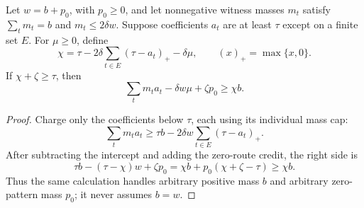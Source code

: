 

\begin{lemma}\label{lem:capped-rank-credit}
Let $w=b+p_0$, with $p_0\ge0$, and let nonnegative witness masses
$m_t$ satisfy $\sum_t m_t=b$ and $m_t\le2\delta w$.
Suppose coefficients $a_t$ are at least $\tau$ except on a finite
set $E$. For $\mu\ge0$, define
\[
 \chi=\tau-2\delta\sum_{t\in E}(\tau-a_t)_+-\delta\mu,
 \qquad (x)_+=\max\{x,0\}.
\]
If $\chi+\zeta\ge\tau$, then
\begin{equation}\label{eq:capped-rank-conversion}
 \sum_t m_t a_t-\delta w\mu+\zeta p_0\ge\chi b.
\end{equation}
\end{lemma}
\begin{proof}
Charge only the coefficients below $\tau$, each using its individual
mass cap:
\[
 \sum_t m_t a_t\ge\tau b-
     2\delta w\sum_{t\in E}(\tau-a_t)_+.
\]
After subtracting the intercept and adding the zero-route credit,
the right side is
\[
 \tau b-(\tau-\chi)w+\zeta p_0
 =\chi b+p_0(\chi+\zeta-\tau)\ge\chi b.
\]
Thus the same calculation handles arbitrary positive mass $b$ and
arbitrary zero-pattern mass $p_0$; it never assumes $b=w$.
\end{proof}

